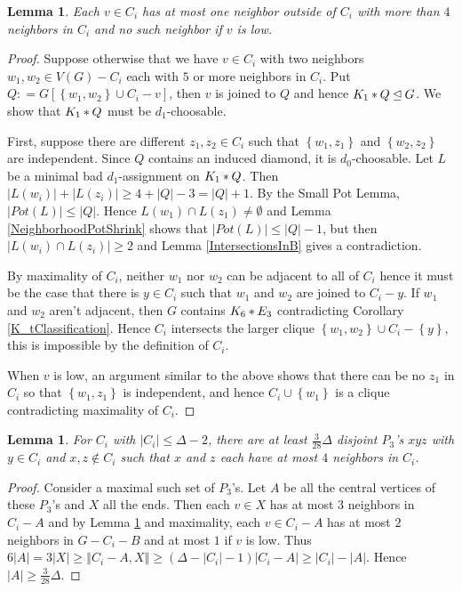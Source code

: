 \documentclass[12pt]{article}
\theoremstyle{plain}
\newtheorem{lem}[thm]{Lemma}
\theoremstyle{definition}
\theoremstyle{remark}
\newcommand{\set}[1]{\left\{ #1 \right\}}
\newcommand{\card}[1]{\left|#1\right|}
\newcommand{\size}[1]{\left\Vert#1\right\Vert}
\newcommand{\join}[2]{#1 \mbox{\hspace{2 pt}$\ast$\hspace{2 pt}} #2}
\newcommand{\DefinedAs}{\mathrel{\mathop:}=}
\begin{document}
\begin{lem}\label{AtMostFourIn}
Each $v \in C_i$ has at most one
neighbor outside of $C_i$ with more than $4$ neighbors in $C_i$ and no such
neighbor if $v$ is low.
\end{lem}
\begin{proof}
Suppose otherwise that we have $v \in C_i$ with two neighbors $w_1, w_2 \in V(G)
- C_i$ each with $5$ or more neighbors in $C_i$.  Put $Q \DefinedAs
G[\set{w_1,w_2} \cup C_i - v]$, then $v$ is joined to $Q$ and hence
$\join{K_1}{Q} \unlhd G$.  We show that $\join{K_1}{Q}$ must be $d_1$-choosable. 

First, suppose there are different $z_1,z_2 \in C_i$ such that $\set{w_1, z_1}$
and $\set{w_2, z_2}$ are independent.  Since $Q$ contains an induced diamond,
it is $d_0$-choosable. Let $L$ be a minimal bad $d_1$-assignment on
$\join{K_1}{Q}$. Then $\card{L(w_i)} + \card{L(z_i)} \geq 4 + \card{Q} - 3 = \card{Q} + 1$.  By the Small Pot Lemma, $\card{Pot(L)} \leq \card{Q}$.  Hence
$L(w_1) \cap L(z_1) \neq \emptyset$ and Lemma \ref{NeighborhoodPotShrink} shows
that $\card{Pot(L)} \leq \card{Q} - 1$, but then $\card{L(w_i) \cap L(z_i)}
\geq 2$ and Lemma \ref{IntersectionsInB} gives a contradiction.

By maximality of $C_i$, neither $w_1$ nor $w_2$ can be adjacent to all of $C_i$
hence it must be the case that there is $y \in C_i$ such that $w_1$ and $w_2$
are joined to $C_i - y$.  If $w_1$ and $w_2$ aren't adjacent, then $G$ contains $\join{K_6}{E_3}$ contradicting Corollary \ref{K_tClassification}.  Hence $C_i$ intersects the larger clique $\set{w_1, w_2} \cup C_i - \set{y}$, this is impossible by the definition of $C_i$.

When $v$ is low, an argument similar to the above shows that there can be no
$z_1$ in $C_i$ so that $\set{w_1, z_1}$ is independent, and hence $C_i \cup
\set{w_1}$ is a clique contradicting maximality of $C_i$.
\end{proof}

\begin{lem}\label{triples}
For $C_i$ with $\card{C_i} \leq \Delta - 2$, there are
at least $\frac{3}{28}\Delta$ disjoint $P_3$'s $xyz$ with $y \in C_i$ and $x, z
\not \in C_i$ such that $x$ and $z$ each have at most $4$ neighbors in $C_i$.
\end{lem}
\begin{proof}
Consider a maximal such set of $P_3$'s. Let $A$ be all the central vertices of
these $P_3$'s and $X$ all the ends.  Then each $v \in X$ has at most $3$
neighbors in $C_i - A$ and by Lemma \ref{AtMostFourIn} and maximality, each $v
\in C_i - A$ has at most $2$ neighbors in $G-C_i-B$ and at most $1$ if $v$ is
low. Thus $6\card{A} = 3\card{X} \geq \size{C_i-A, X} \geq (\Delta - \card{C_i}
- 1)\card{C_i-A} \geq \card{C_i} - \card{A}$.  Hence $\card{A} \geq
\frac{3}{28}\Delta$.
\end{proof}
\end{document}
